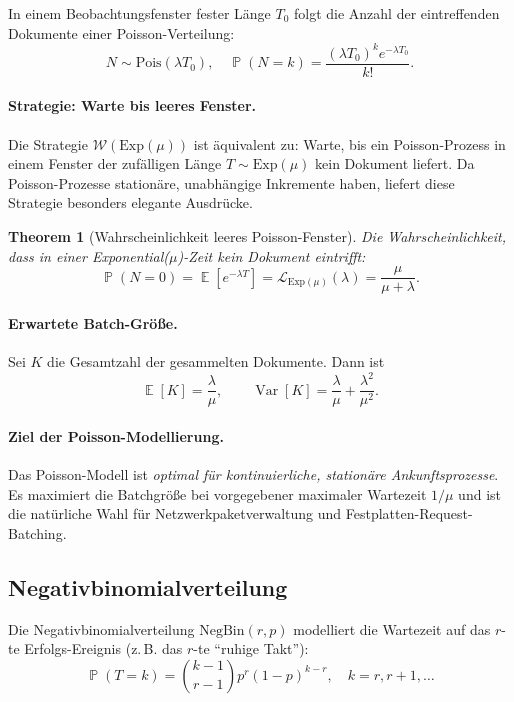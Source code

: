 ﻿\documentclass[12pt, a4paper]{article}
\newtheorem{theorem}{Theorem}[section]
\DeclareMathOperator{\E}{\mathbb{E}}
\DeclareMathOperator{\Var}{Var}
\DeclareMathOperator{\Prob}{\mathbb{P}}
\newcommand{\Exp}{\mathrm{Exp}}
\newcommand{\Pois}{\mathrm{Pois}}
\newcommand{\NBin}{\mathrm{NegBin}}
\begin{document}
In einem Beobachtungsfenster fester Länge $T_0$ folgt die Anzahl der
eintreffenden Dokumente einer Poisson-Verteilung:
\[
  N \sim \Pois(\lambda T_0), \quad
  \Prob(N = k) = \frac{(\lambda T_0)^k e^{-\lambda T_0}}{k!}.
\]

\paragraph{Strategie: Warte bis leeres Fenster.}
Die Strategie $\mathcal{W}(\Exp(\mu))$ ist äquivalent zu: Warte, bis ein
Poisson-Prozess in einem Fenster der zufälligen Länge $T \sim \Exp(\mu)$
kein Dokument liefert. Da Poisson-Prozesse stationäre, unabhängige Inkremente
haben, liefert diese Strategie besonders elegante Ausdrücke.

\begin{theorem}[Wahrscheinlichkeit leeres Poisson-Fenster]
\label{thm:emptypoisson}
Die Wahrscheinlichkeit, dass in einer Exponential($\mu$)-Zeit kein Dokument
eintrifft:
\[
  \Prob(N = 0) = \E\!\left[e^{-\lambda T}\right] = \mathcal{L}_{\Exp(\mu)}(\lambda) = \frac{\mu}{\mu+\lambda}.
\]
\end{theorem}

\paragraph{Erwartete Batch-Größe.}
Sei $K$ die Gesamtzahl der gesammelten Dokumente. Dann ist
\[
  \E[K] = \frac{\lambda}{\mu}, \qquad \Var[K] = \frac{\lambda}{\mu} + \frac{\lambda^2}{\mu^2}.
\]

\paragraph{Ziel der Poisson-Modellierung.}
Das Poisson-Modell ist \emph{optimal für kontinuierliche, stationäre
Ankunftsprozesse}. Es maximiert die Batchgröße bei vorgegebener maximaler
Wartezeit $1/\mu$ und ist die natürliche Wahl für Netzwerkpaketverwaltung
und Festplatten-Request-Batching.

\subsection{Negativbinomialverteilung}\label{subsec:negbin}

Die Negativbinomialverteilung $\NBin(r, p)$ modelliert die Wartezeit auf das
$r$-te Erfolgs-Ereignis (z.\,B. das $r$-te ``ruhige Takt''):
\[
  \Prob(T = k) = \binom{k-1}{r-1} p^r (1-p)^{k-r}, \quad k = r, r+1, \ldots
\]
\end{document}
